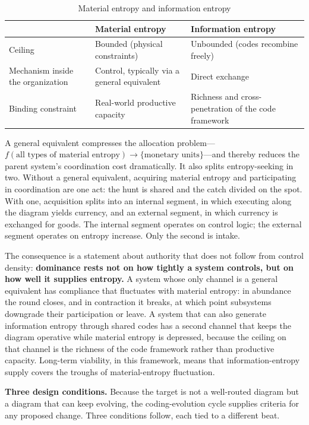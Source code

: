 \documentclass[11pt,a4paper]{article}
\begin{document}
\begin{table}[h]
\centering
\small
\caption{Material entropy and information entropy}
\begin{tabular}{p{4.2cm} p{5.0cm} p{4.6cm}}
\hline
& \textbf{Material entropy} & \textbf{Information entropy} \\
\hline
Ceiling & Bounded (physical constraints) & Unbounded (codes recombine freely) \\
Mechanism inside the organization & Control, typically via a general equivalent & Direct exchange \\
Binding constraint & Real-world productive capacity & Richness and cross-penetration of the code framework \\
\hline
\end{tabular}
\end{table}

A general equivalent compresses the allocation problem---$f(\text{all types of material entropy}) \rightarrow \{\text{monetary units}\}$---and thereby reduces the parent system's coordination cost dramatically. It also splits entropy-seeking in two. Without a general equivalent, acquiring material entropy and participating in coordination are one act: the hunt is shared and the catch divided on the spot. With one, acquisition splits into an internal segment, in which executing along the diagram yields currency, and an external segment, in which currency is exchanged for goods. The internal segment operates on control logic; the external segment operates on entropy increase. Only the second is intake.

The consequence is a statement about authority that does not follow from control density: \textbf{dominance rests not on how tightly a system controls, but on how well it supplies entropy.} A system whose only channel is a general equivalent has compliance that fluctuates with material entropy: in abundance the round closes, and in contraction it breaks, at which point subsystems downgrade their participation or leave. A system that can also generate information entropy through shared codes has a second channel that keeps the diagram operative while material entropy is depressed, because the ceiling on that channel is the richness of the code framework rather than productive capacity. Long-term viability, in this framework, means that information-entropy supply covers the troughs of material-entropy fluctuation.

\textbf{Three design conditions.} Because the target is not a well-routed diagram but a diagram that can keep evolving, the coding-evolution cycle supplies criteria for any proposed change. Three conditions follow, each tied to a different beat.
\end{document}
